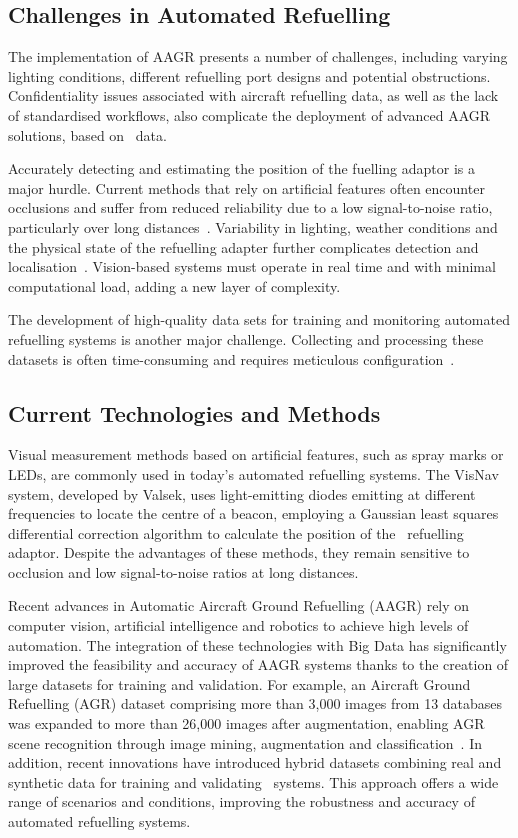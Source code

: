 \documentclass[12pt,oneside]{book} %
\begin{document}
\subsection{Challenges in Automated Refuelling}
The implementation of AAGR presents a number of challenges, including varying
lighting conditions, different refuelling port designs and potential
obstructions. Confidentiality issues associated with aircraft refuelling data,
as well as the lack of standardised workflows, also complicate the deployment
of advanced AAGR solutions, based on~\cite{DatasetAGR} data.

Accurately detecting and estimating the position of the fuelling adaptor is a
major hurdle. Current methods that rely on artificial features often encounter
occlusions and suffer from reduced reliability due to a low signal-to-noise
ratio, particularly over long distances~\cite{AGRPoseEstimation}. Variability
in lighting, weather conditions and the physical state of the refuelling
adapter further complicates detection and
localisation~\cite{HybridDatasetAGRV1}. Vision-based systems must operate in
real time and with minimal computational load, adding a new layer of
complexity.

The development of high-quality data sets for training and monitoring automated
refuelling systems is another major challenge. Collecting and processing these
datasets is often time-consuming and requires meticulous
configuration~\cite{HybridDatasetAGRV2}.

\subsection{Current Technologies and Methods}
Visual measurement methods based on artificial features, such as spray marks or
LEDs, are commonly used in today's automated refuelling systems. The VisNav
system, developed by Valsek, uses light-emitting diodes emitting at different
frequencies to locate the centre of a beacon, employing a Gaussian least
squares differential correction algorithm to calculate the position of
the~\cite{AGRPoseEstimation} refuelling adaptor. Despite the advantages of
these methods, they remain sensitive to occlusion and low signal-to-noise
ratios at long distances.

Recent advances in Automatic Aircraft Ground Refuelling (AAGR) rely on computer
vision, artificial intelligence and robotics to achieve high levels of
automation. The integration of these technologies with Big Data has
significantly improved the feasibility and accuracy of AAGR systems thanks to
the creation of large datasets for training and validation. For example, an
Aircraft Ground Refuelling (AGR) dataset comprising more than 3,000 images from
13 databases was expanded to more than 26,000 images after augmentation,
enabling AGR scene recognition through image mining, augmentation and
classification~\cite{DatasetAGR}. In addition, recent innovations have
introduced hybrid datasets combining real and synthetic data for training and
validating~\cite{HybridDatasetAGRV1} systems. This approach offers a wide range
of scenarios and conditions, improving the robustness and accuracy of automated
refuelling systems.
\end{document}
